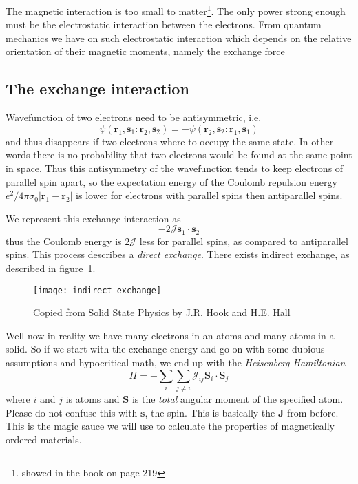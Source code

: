 \documentclass[11pt]{article}
\begin{document}
The magnetic interaction is too small to matter\footnote{showed in the book on page 219}. The only power strong enough must be the electrostatic interaction between the electrons. From quantum mechanics we have on such electrostatic interaction which depends on the relative orientation of their magnetic moments, namely the exchange force
\subsection{The exchange interaction}
Wavefunction of two electrons need to be antisymmetric, i.e.
\begin{equation}
	\psi(\pmb{r}_1, \pmb{s}_1:\pmb{r}_2, \pmb{s}_2) = -  \psi(\pmb{r}_2, \pmb{s}_2:\pmb{r}_1, \pmb{s}_1)
\end{equation}
and thus disappears if two electrons where  to occupy the same state. In other words there is no probability that two electrons would be found at the same point in space. Thus this antisymmetry of the wavefunction tends to keep electrons of parallel spin apart, so the expectation energy of the Coulomb repulsion energy $e^2/4\pi \sigma_0 |\pmb{r}_1 - \pmb{r}_2 |$ is lower for electrons with parallel spins then antiparallel spins. 

We represent this exchange interaction as
\begin{equation}
	-2 \mathscr{J} \pmb{s}_1 \cdot \pmb{s}_2
\end{equation}
thus the Coulomb energy is $2\mathscr{J}$ less for parallel spins, as compared to antiparallel spins. This process describes a \emph{direct exchange}. There exists indirect exchange, as described in figure~\ref{fig:indirect-exchange}.
\begin{figure}[!h]
	\centering
	\texttt{[image: indirect-exchange]}
	\caption{Copied from Solid State Physics by J.R. Hook and H.E. Hall}
	\label{fig:indirect-exchange}
\end{figure}

Well now in reality we have many electrons in an atoms and many atoms in a solid. So if we start with the exchange energy and go on with some dubious assumptions and hypocritical math, we end up with the \emph{Heisenberg Hamiltonian} 
\begin{equation}
	H = - \sum_i \sum_{j \neq i} \mathscr{J}_{ij} \pmb{S}_i \cdot \pmb{S}_j
	\label{eq:heisenberg-hamiltonian}
\end{equation}
where $i$ and $j$ is atoms and $\pmb{S}$ is the \emph{total} angular moment of the specified atom. Please do not confuse this with $\pmb{s}$, the spin. This is basically the $\pmb{J}$ from before. This is the magic sauce we will use to calculate the properties of magnetically ordered materials.
\end{document}
